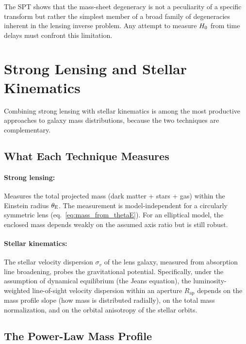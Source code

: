\begin{remark}
The SPT shows that the mass-sheet degeneracy is not a peculiarity of
a specific transform but rather the simplest member of a broad family
of degeneracies inherent in the lensing inverse problem.  Any attempt
to measure $H_0$ from time delays must confront this
limitation.
\end{remark}


\section{Strong Lensing and Stellar Kinematics}
\label{sec:lensing_kinematics}

Combining strong lensing with stellar kinematics is among the most
productive approaches to galaxy mass distributions, because the two
techniques are complementary.

\subsection{What Each Technique Measures}

\paragraph{Strong lensing:}
Measures the total projected mass (dark matter + stars +
gas) within the Einstein radius $\theta_{\mathrm{E}}$.  The measurement is
model-independent for a circularly symmetric lens
(eq.~\ref{eq:mass_from_thetaE}).  For an elliptical model, the
enclosed mass depends weakly on the assumed axis ratio but is still
robust.

\paragraph{Stellar kinematics:}
The stellar velocity dispersion $\sigma_v$ of the lens galaxy,
measured from absorption line broadening, probes the gravitational
potential.  Specifically, under the assumption of dynamical
equilibrium (the Jeans equation), the luminosity-weighted line-of-sight
velocity dispersion within an aperture $R_{\mathrm{ap}}$ depends on
the mass profile slope (how mass is distributed radially), on the
total mass normalization, and on the orbital anisotropy of the
stellar orbits.

\subsection{The Power-Law Mass Profile}
\label{sec:power_law_profile}

